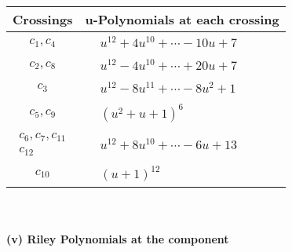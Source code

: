 \documentclass[1p]{elsarticle_modified}
\theoremstyle{definition}
\begin{document}
\begin{tabular}{m{50pt}|m{274pt}}
Crossings & \hspace{64pt}u-Polynomials at each crossing \\
\hline $$\begin{aligned}c_{1},c_{4}\end{aligned}$$&$\begin{aligned}
&u^{12}+4 u^{10}+\cdots-10 u+7
\end{aligned}$\\
\hline $$\begin{aligned}c_{2},c_{8}\end{aligned}$$&$\begin{aligned}
&u^{12}-4 u^{10}+\cdots+20 u+7
\end{aligned}$\\
\hline $$\begin{aligned}c_{3}\end{aligned}$$&$\begin{aligned}
&u^{12}-8 u^{11}+\cdots-8 u^2+1
\end{aligned}$\\
\hline $$\begin{aligned}c_{5},c_{9}\end{aligned}$$&$\begin{aligned}
&(u^2+u+1)^6
\end{aligned}$\\
\hline $$\begin{aligned}c_{6},c_{7},c_{11}\\c_{12}\end{aligned}$$&$\begin{aligned}
&u^{12}+8 u^{10}+\cdots-6 u+13
\end{aligned}$\\
\hline $$\begin{aligned}c_{10}\end{aligned}$$&$\begin{aligned}
&(u+1)^{12}
\end{aligned}$\\
\hline
\end{tabular}\\~\\
\newpage\renewcommand{\arraystretch}{1}
\flushleft \textbf{(v) Riley Polynomials at the component}\newline \\
\end{document}
